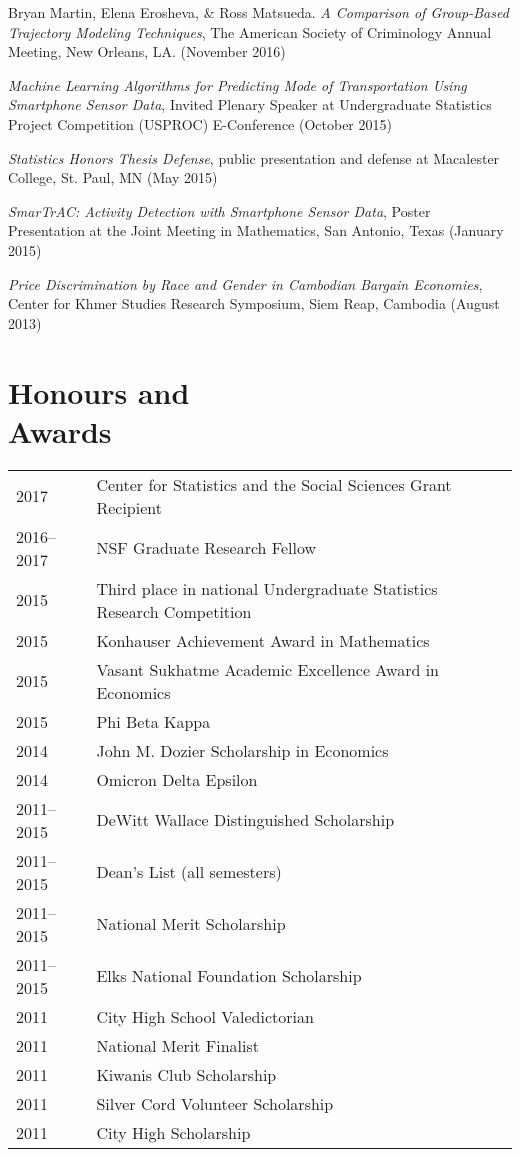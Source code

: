 \documentclass[margin,centered]{res}
\begin{document}
\begin{resume}
Bryan Martin, Elena Erosheva, \& Ross Matsueda. \emph{A Comparison of Group-Based Trajectory Modeling Techniques}, The American Society of Criminology Annual Meeting, New Orleans, LA. (November 2016)

\emph{Machine Learning Algorithms for Predicting Mode of Transportation Using Smartphone Sensor Data}, Invited Plenary Speaker at Undergraduate Statistics Project Competition (USPROC) E-Conference (October 2015)

\emph{Statistics Honors Thesis Defense}, public presentation and defense at Macalester College, St. Paul, MN (May 2015)

\emph{SmarTrAC: Activity Detection with Smartphone Sensor Data}, Poster Presentation at the Joint Meeting in Mathematics, San Antonio, Texas (January 2015)

\emph{Price Discrimination by Race and Gender in Cambodian Bargain Economies}, Center for Khmer Studies Research Symposium, Siem Reap, Cambodia (August 2013)



\section{\sc Honours and\\ Awards}

\begin{tabular}{@{}p{0.8in}p{4in}}
2017 & Center for Statistics and the Social Sciences Grant Recipient\\
2016--2017 & NSF Graduate Research Fellow\\
2015 & Third place in national Undergraduate Statistics Research Competition\\
2015 & Konhauser Achievement Award in Mathematics\\
2015 & Vasant Sukhatme Academic Excellence Award in Economics \\
2015 & Phi Beta Kappa\\
2014 & John M. Dozier Scholarship in Economics \\
2014 & Omicron Delta Epsilon\\
2011--2015 & DeWitt Wallace Distinguished Scholarship \\
2011--2015 & Dean's List (all semesters)\\
2011--2015 & National Merit Scholarship \\
2011--2015 & Elks National Foundation Scholarship\\
2011 & City High School Valedictorian\\
2011 & National Merit Finalist\\
2011 & Kiwanis Club Scholarship \\
2011 & Silver Cord Volunteer Scholarship\\
2011 & City High Scholarship\\
\end{tabular}




\end{resume}
\end{document}
